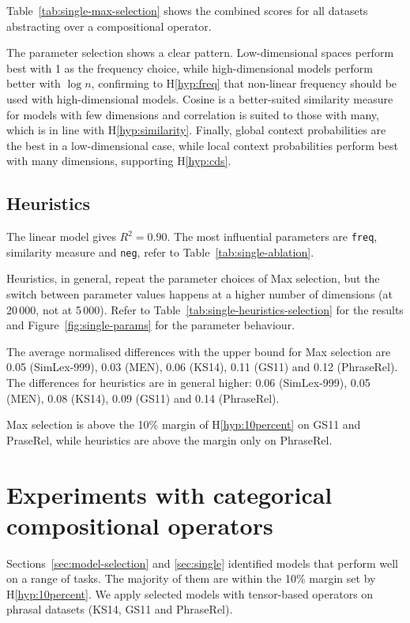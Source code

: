Table~\ref{tab:single-max-selection} shows the combined scores for all datasets abstracting over a compositional operator.

The parameter selection shows a clear pattern. Low-dimensional spaces perform best with 1 as the frequency choice, while high-dimensional models perform better with $\log n$, confirming to H\ref{hyp:freq} that non-linear frequency should be used with high-dimensional models. Cosine is a better-suited similarity measure for models with few dimensions and correlation is suited to those with many, which is in line with H\ref{hyp:similarity}. Finally, global context probabilities are the best in a low-dimensional case, while local context probabilities perform best with many dimensions, supporting H\ref{hyp:cds}.

\subsection{Heuristics}
\label{sec:heuristics-single}



The linear model gives $R^2 = 0.90$. The most influential parameters are \texttt{freq}, similarity measure and \texttt{neg}, refer to Table~\ref{tab:single-ablation}.

Heuristics, in general, repeat the parameter choices of Max selection, but the switch between parameter values happens at a higher number of dimensions (at 20\,000, not at 5\,000). Refer to Table~\ref{tab:single-heuristics-selection} for the results and Figure~\ref{fig:single-params} for the parameter behaviour.

The average normalised differences with the upper bound for Max selection are 0.05 (SimLex-999), 0.03 (MEN), 0.06 (KS14), 0.11 (GS11) and 0.12 (PhraseRel). The differences for heuristics are in general higher: 0.06 (SimLex-999), 0.05 (MEN), 0.08 (KS14), 0.09 (GS11) and 0.14 (PhraseRel).

Max selection is above the 10\% margin of H\ref{hyp:10percent} on GS11 and PraseRel, while heuristics are above the margin only on PhraseRel.

\section{Experiments with categorical compositional operators}
\label{sec:frob-comp-oper}

Sections~\ref{sec:model-selection} and \ref{sec:single} identified models that perform well on a range of tasks. The majority of them are within the 10\% margin set by H\ref{hyp:10percent}. We apply selected models with tensor-based operators on phrasal datasets (KS14, GS11 and PhraseRel).

